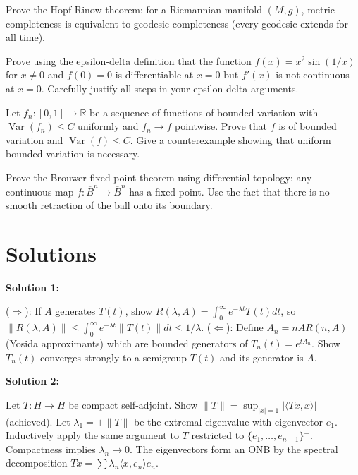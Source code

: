 \documentclass[12pt,a4paper]{exam}
\begin{document}
\begin{questions}
\question[3]
Prove the Hopf-Rinow theorem: for a Riemannian manifold $(M,g)$, metric completeness is equivalent to geodesic completeness (every geodesic extends for all time).

\vspace{0.3cm}

\question[7]
Prove using the epsilon-delta definition that the function $f(x) = x^2 \sin(1/x)$ for $x \neq 0$ and $f(0) = 0$ is differentiable at $x = 0$ but $f'(x)$ is not continuous at $x = 0$. Carefully justify all steps in your epsilon-delta arguments.

\vspace{0.3cm}

\question[2]
Let $f_n: [0,1] \to \mathbb{R}$ be a sequence of functions of bounded variation with $\operatorname{Var}(f_n) \leq C$ uniformly and $f_n \to f$ pointwise. Prove that $f$ is of bounded variation and $\operatorname{Var}(f) \leq C$. Give a counterexample showing that uniform bounded variation is necessary.

\vspace{0.3cm}

\question[3]
Prove the Brouwer fixed-point theorem using differential topology: any continuous map $f: \overline{B}^n \to \overline{B}^n$ has a fixed point. Use the fact that there is no smooth retraction of the ball onto its boundary.

\vspace{0.3cm}

\end{questions}

\newpage
\section*{Solutions}

\textbf{Solution 1:}

($\Rightarrow$): If $A$ generates $T(t)$, show $R(\lambda,A) = \int_0^\infty e^{-\lambda t} T(t) dt$, so $\|R(\lambda,A)\| \leq \int_0^\infty e^{-\lambda t} \|T(t)\| dt \leq 1/\lambda$. ($\Leftarrow$): Define $A_n = nAR(n,A)$ (Yosida approximants) which are bounded generators of $T_n(t) = e^{t A_n}$. Show $T_n(t)$ converges strongly to a semigroup $T(t)$ and its generator is $A$.

\vspace{0.5cm}

\textbf{Solution 2:}

Let $T: H \to H$ be compact self-adjoint. Show $\|T\| = \sup_{|x|=1} |\langle Tx, x \rangle|$ (achieved). Let $\lambda_1 = \pm\|T\|$ be the extremal eigenvalue with eigenvector $e_1$. Inductively apply the same argument to $T$ restricted to $\{e_1,\ldots,e_{n-1}\}^\perp$. Compactness implies $\lambda_n \to 0$. The eigenvectors form an ONB by the spectral decomposition $Tx = \sum \lambda_n \langle x, e_n \rangle e_n$.
\end{document}

